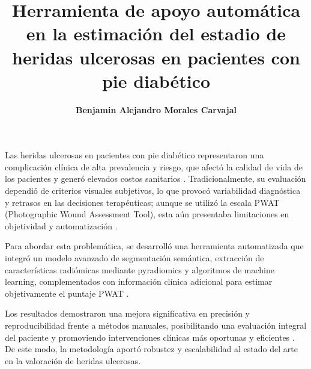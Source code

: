 \documentclass[12pt,letterpaper]{report}
\begin{document}
\title{\textbf{Herramienta de apoyo automática en la estimación del estadio de heridas ulcerosas en pacientes con pie diabético}}
\author{\textbf{Benjamin Alejandro Morales Carvajal}}


\beforepreface
{}

Las heridas ulcerosas en pacientes con pie diabético representaron una complicación clínica de alta prevalencia y riesgo, que afectó la calidad de vida de los pacientes y generó elevados costos sanitarios . Tradicionalmente, su evaluación dependió de criterios visuales subjetivos, lo que provocó variabilidad diagnóstica y retrasos en las decisiones terapéuticas; aunque se utilizó la escala PWAT (Photographic Wound Assessment Tool), esta aún presentaba limitaciones en objetividad y automatización .

Para abordar esta problemática, se desarrolló una herramienta automatizada que integró un modelo avanzado de segmentación semántica, extracción de características radiómicas mediante pyradiomics y algoritmos de machine learning, complementados con información clínica adicional para estimar objetivamente el puntaje PWAT .

Los resultados demostraron una mejora significativa en precisión y reproducibilidad frente a métodos manuales, posibilitando una evaluación integral del paciente y promoviendo intervenciones clínicas más oportunas y eficientes . De este modo, la metodología aportó robustez y escalabilidad al estado del arte en la valoración de heridas ulcerosas.
\end{document}
